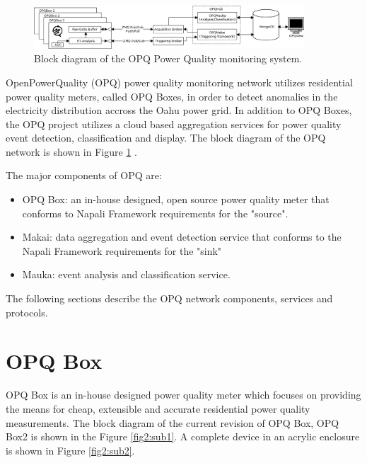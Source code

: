 \begin{figure}[h]
  \begin{center}
  \includegraphics[width=0.9\textwidth]{img/system-diagram.png}
  \end{center}
  \caption{Block diagram of the OPQ Power Quality monitoring system.}
  \label{fig:1}
\end{figure}

OpenPowerQuality (OPQ) power quality monitoring network utilizes residential power quality meters, called OPQ Boxes, in order to detect anomalies in the electricity distribution accross the Oahu power grid. In addition to OPQ Boxes, the OPQ project utilizes a cloud based aggregation services for power quality event detection, classification and display. The block diagram of the OPQ network is shown in Figure \ref{fig:1} .

The major components of OPQ are:
\begin {itemize}
	\item OPQ Box: an in-house designed, open source power quality meter that conforms to Napali Framework requirements for the "source".
	\item Makai: data aggregation and event detection service that conforms to the Napali Framework requirements for the "sink"
	\item Mauka: event analysis and classification service.
\end {itemize}

The following sections describe the OPQ network components, services and protocols.

\section{OPQ Box}

OPQ Box is an in-house designed power quality meter which focuses on providing the means for cheap, extensible and accurate residential power quality measurements. The block diagram of the current revision of OPQ Box, OPQ Box2 is shown in the Figure \ref{fig2:sub1}. A complete device in an acrylic enclosure is shown in Figure \ref{fig2:sub2}.

